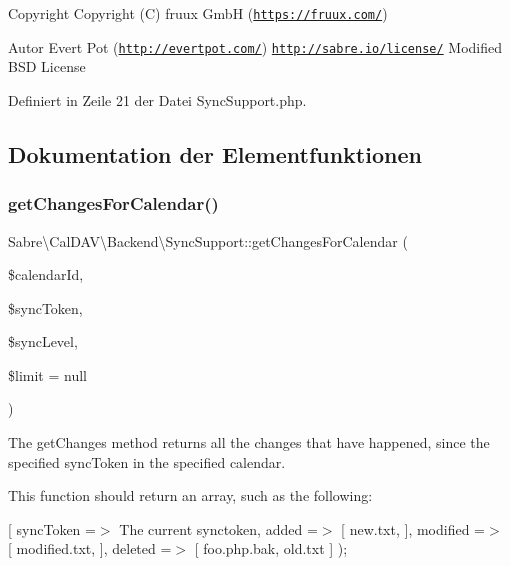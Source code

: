 \begin{DoxyCopyright}{Copyright}
Copyright (C) fruux GmbH (\href{https://fruux.com/}{\tt https\+://fruux.\+com/}) 
\end{DoxyCopyright}
\begin{DoxyAuthor}{Autor}
Evert Pot (\href{http://evertpot.com/}{\tt http\+://evertpot.\+com/})  \href{http://sabre.io/license/}{\tt http\+://sabre.\+io/license/} Modified B\+SD License 
\end{DoxyAuthor}


Definiert in Zeile 21 der Datei Sync\+Support.\+php.



\subsection{Dokumentation der Elementfunktionen}
\mbox{\label{interface_sabre_1_1_cal_d_a_v_1_1_backend_1_1_sync_support_abe47a53f20bbcd3f5634e1104ea84666}} 
\subsubsection{\texorpdfstring{get\+Changes\+For\+Calendar()}{getChangesForCalendar()}}
{\footnotesize\ttfamily Sabre\textbackslash{}\+Cal\+D\+A\+V\textbackslash{}\+Backend\textbackslash{}\+Sync\+Support\+::get\+Changes\+For\+Calendar (\begin{DoxyParamCaption}\item[{}]{\$calendar\+Id,  }\item[{}]{\$sync\+Token,  }\item[{}]{\$sync\+Level,  }\item[{}]{\$limit = {\ttfamily null} }\end{DoxyParamCaption})}

The get\+Changes method returns all the changes that have happened, since the specified sync\+Token in the specified calendar.

This function should return an array, such as the following\+:

\mbox{[} \textquotesingle{}sync\+Token\textquotesingle{} =$>$ \textquotesingle{}The current synctoken\textquotesingle{}, \textquotesingle{}added\textquotesingle{} =$>$ \mbox{[} \textquotesingle{}new.\+txt\textquotesingle{}, \mbox{]}, \textquotesingle{}modified\textquotesingle{} =$>$ \mbox{[} \textquotesingle{}modified.\+txt\textquotesingle{}, \mbox{]}, \textquotesingle{}deleted\textquotesingle{} =$>$ \mbox{[} \textquotesingle{}foo.\+php.\+bak\textquotesingle{}, \textquotesingle{}old.\+txt\textquotesingle{} \mbox{]} );


